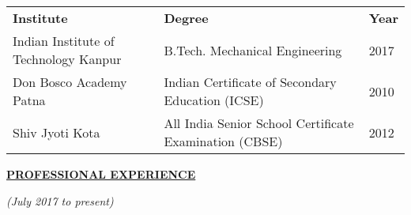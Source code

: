\documentclass[a4paper]{deedy-resume} %
\begin{document}
\begin{tabular}{|l|l|l|}
\cline{1-3}
\rule{0pt}{2.2ex}
\textbf{\hspace{60pt}Institute\hspace{90pt}}&\textbf{\hspace{120pt}Degree\hspace{120pt} }&\textbf{\hspace{20pt}Year\hspace{20pt} }\\
\cline{1-3}
\rule{0pt}{2.2ex}
\hspace{6pt}Indian Institute of Technology Kanpur        \hspace{10pt}&\hspace{74pt}B.Tech. Mechanical Engineering&\hspace{20pt}2017 \\
\hspace{26pt}Don Bosco Academy Patna&\hspace{32pt}Indian Certificate of Secondary Education (ICSE)\hspace{17pt}&\hspace{20pt}2010\\
\hspace{47pt}Shiv Jyoti Kota\hspace{45pt}&\hspace{20pt}All India Senior School Certificate Examination (CBSE)&\hspace{20pt}2012\\
\cline{1-3}
\end{tabular}
\sectionspace

{\uppercase\uline{\textbf{\large{Professional Experience}}\hfill}}
\microspace


\hfill {\textit{\small(July 2017 to present)}}\\
\end{document}
